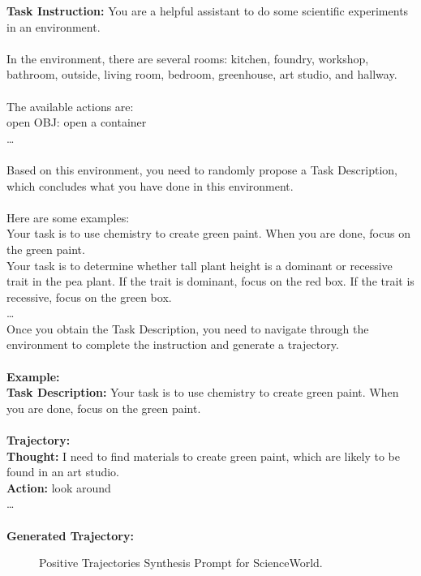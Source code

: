 \begin{tcolorbox}[breakable,title=Positive Trajectory Synthesis Prompt for ScienceWorld]
\textcolor{my_blue!50}{\textbf{Task Instruction:} You are a helpful assistant to do some scientific experiments in an environment. \\
\\
In the environment, there are several rooms: kitchen, foundry, workshop, bathroom, outside, living room, bedroom, greenhouse, art studio, and hallway. \\
\\
The available actions are: \\
open OBJ: open a container \\
… \\
\\
Based on this environment, you need to randomly propose a Task Description, which concludes what you have done in this environment.\\
\\
Here are some examples:\\
Your task is to use chemistry to create green paint. When you are done, focus on the green paint.\\
Your task is to determine whether tall plant height is a dominant or recessive trait in the pea plant. If the trait is dominant, focus on the red box. If the trait is recessive, focus on the green box.\\
…
\\
Once you obtain the Task Description, you need to navigate through the environment to complete the instruction and generate a trajectory.\\
}\\
\textcolor{my_green!50}{\textbf{Example:} }\\
\textcolor{my_purple}{
\textbf{Task Description:} Your task is to use chemistry to create green paint. When you are done, focus on the green paint.\\
}\\
\textcolor{my_purple}{
\textbf{Trajectory:}\\
\textbf{Thought:} I need to find materials to create green paint, which are likely to be found in an art studio.\\
\textbf{Action:} look around\\
…\\
}\\
\textcolor{my_blue!50}{\textbf{Generated Trajectory: }
}\\
\end{tcolorbox}
\begin{figure}[!htp]
    \centering
    \vspace{-8pt}
    \caption{
    Positive Trajectories Synthesis Prompt for ScienceWorld.
    }
    \label{fig:pos_trajectories_synthesis_sciworld}
\end{figure}

